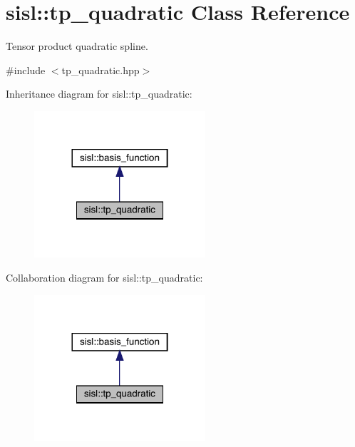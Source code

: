 \hypertarget{classsisl_1_1tp__quadratic}{}\section{sisl\+:\+:tp\+\_\+quadratic Class Reference}
\label{classsisl_1_1tp__quadratic}


Tensor product quadratic spline.  




{\ttfamily \#include $<$tp\+\_\+quadratic.\+hpp$>$}



Inheritance diagram for sisl\+:\+:tp\+\_\+quadratic\+:\nopagebreak
\begin{figure}[H]
\begin{center}
\leavevmode
\includegraphics[width=180pt]{classsisl_1_1tp__quadratic__inherit__graph}
\end{center}
\end{figure}


Collaboration diagram for sisl\+:\+:tp\+\_\+quadratic\+:\nopagebreak
\begin{figure}[H]
\begin{center}
\leavevmode
\includegraphics[width=180pt]{classsisl_1_1tp__quadratic__coll__graph}
\end{center}
\end{figure}
